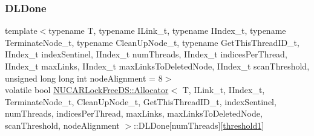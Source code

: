 \mbox{\label{class_n_u_c_a_r_lock_free_d_s_1_1_allocator_af93543d254eaef573bd4fb471c79ae29}} 
\subsubsection{\texorpdfstring{D\+L\+Done}{DLDone}}
{\footnotesize\ttfamily template$<$typename T, typename I\+Link\+\_\+t, typename I\+Index\+\_\+t, typename Terminate\+Node\+\_\+t, typename Clean\+Up\+Node\+\_\+t, typename Get\+This\+Thread\+I\+D\+\_\+t, I\+Index\+\_\+t index\+Sentinel, I\+Index\+\_\+t num\+Threads, I\+Index\+\_\+t indices\+Per\+Thread, I\+Index\+\_\+t max\+Links, I\+Index\+\_\+t max\+Links\+To\+Deleted\+Node, I\+Index\+\_\+t scan\+Threshold, unsigned long long int node\+Alignment = 8$>$ \\
volatile bool \mbox{\hyperlink{class_n_u_c_a_r_lock_free_d_s_1_1_allocator}{N\+U\+C\+A\+R\+Lock\+Free\+D\+S\+::\+Allocator}}$<$ T, I\+Link\+\_\+t, I\+Index\+\_\+t, Terminate\+Node\+\_\+t, Clean\+Up\+Node\+\_\+t, Get\+This\+Thread\+I\+D\+\_\+t, index\+Sentinel, num\+Threads, indices\+Per\+Thread, max\+Links, max\+Links\+To\+Deleted\+Node, scan\+Threshold, node\+Alignment $>$\+::D\+L\+Done\mbox{[}num\+Threads\mbox{]}\mbox{[}\mbox{\hyperlink{class_n_u_c_a_r_lock_free_d_s_1_1_allocator_a1d220e1cc963fc9fb37e46a416504715}{threshold1}}\mbox{]}\hspace{0.3cm}{\ttfamily [private]}}

\mbox{\label{class_n_u_c_a_r_lock_free_d_s_1_1_allocator_a040473eedb2591853976bd963e8522e6}} 

